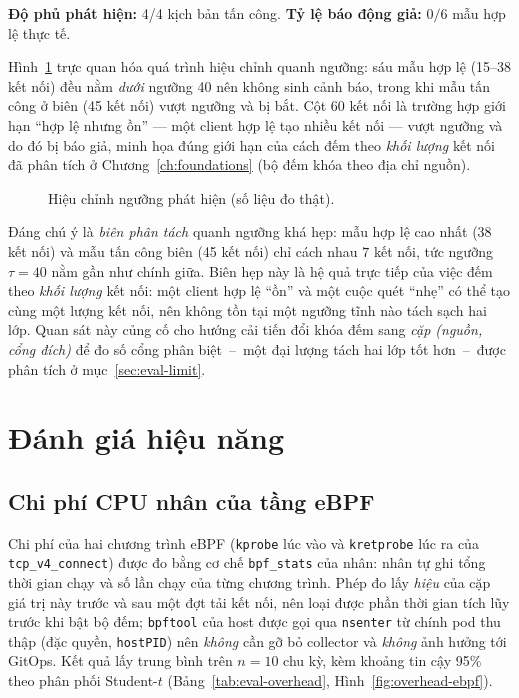 \noindent\textbf{Độ phủ phát hiện:} 4/4 kịch bản tấn công.\quad
\textbf{Tỷ lệ báo động giả:} $0/6$ mẫu hợp lệ thực tế.

Hình~\ref{fig:eval-detection} trực quan hóa quá trình hiệu chỉnh quanh ngưỡng: sáu mẫu hợp
lệ (15--38 kết nối) đều nằm \emph{dưới} ngưỡng 40 nên không sinh cảnh báo, trong khi mẫu
tấn công ở biên (45 kết nối) vượt ngưỡng và bị bắt. Cột 60 kết nối là trường hợp giới hạn
``hợp lệ nhưng ồn'' --- một client hợp lệ tạo nhiều kết nối --- vượt ngưỡng và do đó bị báo
giả, minh họa đúng giới hạn của cách đếm theo \emph{khối lượng} kết nối đã phân tích ở
Chương~\ref{ch:foundations} (bộ đếm khóa theo địa chỉ nguồn).

\begin{figure}[H]
  \centering
  \resizebox{0.82\linewidth}{!}{}
  \caption{Hiệu chỉnh ngưỡng phát hiện (số liệu đo thật).}
  \label{fig:eval-detection}
\end{figure}

Đáng chú ý là \emph{biên phân tách} quanh ngưỡng khá hẹp: mẫu hợp lệ cao nhất (38 kết
nối) và mẫu tấn công biên (45 kết nối) chỉ cách nhau $7$ kết nối, tức ngưỡng $\tau=40$
nằm gần như chính giữa. Biên hẹp này là hệ quả trực tiếp của việc đếm theo \emph{khối
lượng} kết nối: một client hợp lệ ``ồn'' và một cuộc quét ``nhẹ'' có thể tạo cùng một
lượng kết nối, nên không tồn tại một ngưỡng tĩnh nào tách sạch hai lớp. Quan sát này
củng cố cho hướng cải tiến đổi khóa đếm sang \emph{cặp (nguồn, cổng đích)} để đo số
cổng phân biệt~--~một đại lượng tách hai lớp tốt hơn~--~được phân tích ở
mục~\ref{sec:eval-limit}.

\section{Đánh giá hiệu năng}

\subsection{Chi phí CPU nhân của tầng eBPF}
\label{sec:eval-overhead}

Chi phí của hai chương trình eBPF (\texttt{kprobe} lúc vào và \texttt{kretprobe}
lúc ra của \texttt{tcp\_v4\_connect}) được đo bằng cơ chế \texttt{bpf\_stats} của
nhân: nhân tự ghi tổng thời gian chạy và số lần chạy của từng chương trình. Phép
đo lấy \emph{hiệu} của cặp giá trị này trước và sau một đợt tải kết nối, nên loại
được phần thời gian tích lũy trước khi bật bộ đếm; \texttt{bpftool} của host được
gọi qua \texttt{nsenter} từ chính pod thu thập (đặc quyền, \texttt{hostPID}) nên
\emph{không} cần gỡ bỏ collector và \emph{không} ảnh hưởng tới GitOps. Kết quả lấy
trung bình trên $n = 10$ chu kỳ, kèm khoảng tin cậy 95\% theo phân phối
Student-$t$ (Bảng~\ref{tab:eval-overhead}, Hình~\ref{fig:overhead-ebpf}).

